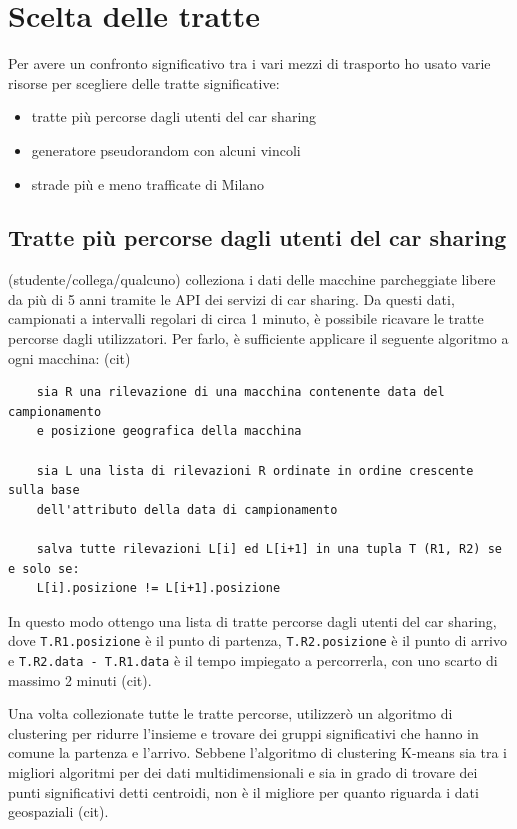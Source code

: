 \documentclass[a4paper]{report}
\begin{document}
	\section{Scelta delle tratte}
	{\large
		Per avere un confronto significativo tra i vari mezzi di trasporto ho usato varie risorse per scegliere delle tratte significative:
		\begin{itemize}
			\item tratte più percorse dagli utenti del car sharing
			\item generatore pseudorandom con alcuni vincoli
			\item strade più e meno trafficate di Milano
		\end{itemize}
	}

	\subsection{Tratte più percorse dagli utenti del car sharing}
	(studente/collega/qualcuno) colleziona i dati delle macchine parcheggiate libere da più di 5 anni tramite le API dei servizi di car sharing. Da questi dati, campionati a intervalli regolari di circa 1 minuto, è possibile ricavare le tratte percorse dagli utilizzatori. Per farlo, è sufficiente applicare il seguente algoritmo a ogni macchina: (cit)
	\begin{verbatim}
	sia R una rilevazione di una macchina contenente data del campionamento
	e posizione geografica della macchina
	
	sia L una lista di rilevazioni R ordinate in ordine crescente sulla base
	dell'attributo della data di campionamento
	
	salva tutte rilevazioni L[i] ed L[i+1] in una tupla T (R1, R2) se e solo se:
	L[i].posizione != L[i+1].posizione
	\end{verbatim}
	In questo modo ottengo una lista di tratte percorse dagli utenti del car sharing, dove \texttt{T.R1.posizione} è il punto di partenza, \texttt{T.R2.posizione} è il punto di arrivo e \texttt{T.R2.data - T.R1.data} è il tempo impiegato a percorrerla, con uno scarto di massimo 2 minuti (cit).
	
	Una volta collezionate tutte le tratte percorse, utilizzerò un algoritmo di clustering per ridurre l'insieme e trovare dei gruppi significativi che hanno in comune la partenza e l'arrivo. Sebbene l'algoritmo di clustering K-means sia tra i migliori algoritmi per dei dati multidimensionali e sia in grado di trovare dei punti significativi detti centroidi, non è il migliore per quanto riguarda i dati geospaziali (cit).
		

	
	
\end{document}
